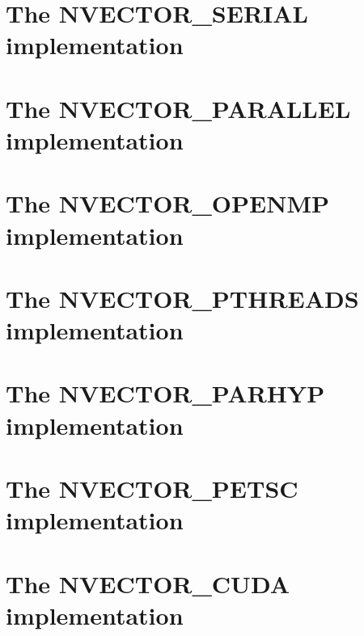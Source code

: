 \section{The NVECTOR\_SERIAL implementation}\label{ss:nvec_ser}


\section{The NVECTOR\_PARALLEL implementation}\label{ss:nvec_par}


\section{The NVECTOR\_OPENMP implementation}\label{ss:nvec_openmp}


\section{The NVECTOR\_PTHREADS implementation}\label{ss:nvec_pthreads}


\section{The NVECTOR\_PARHYP implementation}\label{ss:nvec_parhyp}


\section{The NVECTOR\_PETSC implementation}\label{ss:nvec_petsc}


\section{The NVECTOR\_CUDA implementation}\label{ss:nvec_cuda}


